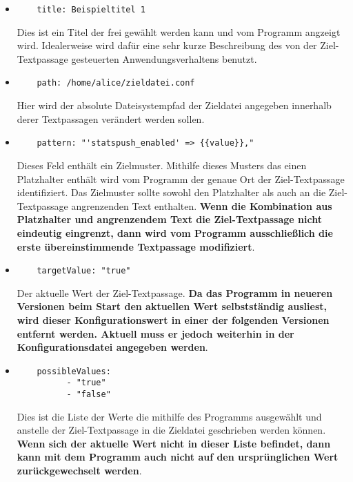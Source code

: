 \begin{itemize}
  \item \begin{verbatim}
    title: Beispieltitel 1
  \end{verbatim}
        Dies ist ein Titel der frei gewählt werden kann und vom Programm angzeigt
        wird. Idealerweise wird dafür eine sehr kurze Beschreibung des von der
        Ziel-\gls{Textpassage} gesteuerten Anwendungsverhaltens benutzt.
  \item \begin{verbatim}
    path: /home/alice/zieldatei.conf
  \end{verbatim}
        Hier wird der absolute Dateisystempfad der Zieldatei angegeben innerhalb
        derer \gls{Textpassage}n  verändert werden sollen.
  \item \begin{verbatim}
    pattern: "'statspush_enabled' => {{value}},"
  \end{verbatim}
        Dieses Feld enthält ein \gls{Zielmuster}. Mithilfe dieses Musters das einen
        \gls{Platzhalter} enthält wird vom Programm der genaue Ort der Ziel-\gls{Textpassage}
        identifiziert. Das \gls{Zielmuster} sollte sowohl den \gls{Platzhalter}
        als auch an die Ziel-\gls{Textpassage} angrenzenden Text enthalten.
        \textbf{Wenn die Kombination aus \gls{Platzhalter} und angrenzendem Text
          die Ziel-\gls{Textpassage} nicht eindeutig eingrenzt, dann wird vom
          Programm ausschließlich die erste übereinstimmende \gls{Textpassage}
          modifiziert}.
  \item \begin{verbatim}
    targetValue: "true"
  \end{verbatim}
        Der aktuelle Wert der Ziel-\gls{Textpassage}.
        \textbf{Da das Programm in neueren Versionen beim Start den aktuellen
          Wert selbstständig ausliest, wird dieser Konfigurationswert in einer
          der folgenden Versionen entfernt werden. Aktuell muss er jedoch weiterhin
          in der Konfigurationsdatei angegeben werden}.
  \item \begin{verbatim}
    possibleValues:
          - "true"
          - "false"
  \end{verbatim}
        Dies ist die Liste der Werte die mithilfe des Programms ausgewählt und
        anstelle der Ziel-\gls{Textpassage} in die Zieldatei geschrieben werden
        können. \textbf{Wenn sich der aktuelle Wert nicht in dieser Liste befindet,
          dann kann mit dem Programm auch nicht auf den ursprünglichen Wert
          zurückgewechselt werden}.
\end{itemize}